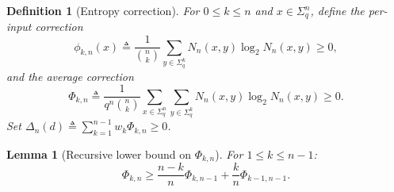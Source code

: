 \documentclass[10pt,a4paper]{amsart}
\newtheorem{definition}{Definition}
\newtheorem{lemma}{Lemma}
\begin{document}
\begin{definition}[Entropy correction]
\label{def:Phi}
For $0\le k\le n$ and $x\in\Sigma_q^n$, define the
\emph{per-input correction}
\begin{equation}
  \phi_{k,n}(x)\triangleq \frac{1}{\binom{n}{k}}
  \sum_{y\in\Sigma_q^k}N_n(x,y)\log_2 N_n(x,y)\ge 0,
  \label{eq:phi}
\end{equation}
and the \emph{average correction}
\begin{equation}
  \Phi_{k,n}\triangleq \frac{1}{q^n\binom{n}{k}}
  \sum_{x\in\Sigma_q^n}\sum_{y\in\Sigma_q^k}
  N_n(x,y)\log_2 N_n(x,y)\ge 0.
  \label{eq:Phi}
\end{equation}
Set $\Delta_n(d)\triangleq \sum_{k=1}^{n-1}w_k\Phi_{k,n}\ge 0$.
\end{definition}

\begin{lemma}[Recursive lower bound on $\Phi_{k,n}$]
\label{lem:Phi_rec}
For $1\le k\le n-1$:
\begin{equation}
  \Phi_{k,n}\ge\frac{n-k}{n}\Phi_{k,n-1}+\frac{k}{n}\Phi_{k-1,n-1}.
  \label{eq:Phi_rec}
\end{equation}
\end{lemma}
\end{document}
